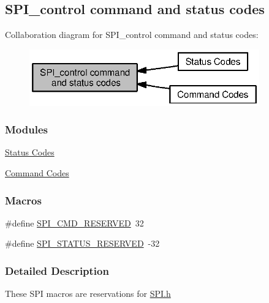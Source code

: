 \subsection{S\+P\+I\+\_\+control command and status codes}
\label{group___s_p_i___c_o_n_t_r_o_l}
Collaboration diagram for S\+P\+I\+\_\+control command and status codes\+:
\nopagebreak
\begin{figure}[H]
\begin{center}
\leavevmode
\includegraphics[width=281pt]{group___s_p_i___c_o_n_t_r_o_l}
\end{center}
\end{figure}
\subsubsection*{Modules}
\begin{DoxyCompactItemize}
\item 
\hyperlink{group___s_p_i___s_t_a_t_u_s}{Status Codes}
\item 
\hyperlink{group___s_p_i___c_m_d}{Command Codes}
\end{DoxyCompactItemize}
\subsubsection*{Macros}
\begin{DoxyCompactItemize}
\item 
\#define \hyperlink{group___s_p_i___c_o_n_t_r_o_l_ga3d23d16525ee76f77276472d8dea80b0}{S\+P\+I\+\_\+\+C\+M\+D\+\_\+\+R\+E\+S\+E\+R\+V\+E\+D}~32
\item 
\#define \hyperlink{group___s_p_i___c_o_n_t_r_o_l_gae1af8c6ebf5e8fe481649f65e37b1b9f}{S\+P\+I\+\_\+\+S\+T\+A\+T\+U\+S\+\_\+\+R\+E\+S\+E\+R\+V\+E\+D}~-\/32
\end{DoxyCompactItemize}


\subsubsection{Detailed Description}
These S\+P\+I macros are reservations for \hyperlink{_s_p_i_8h}{S\+P\+I.\+h} 

